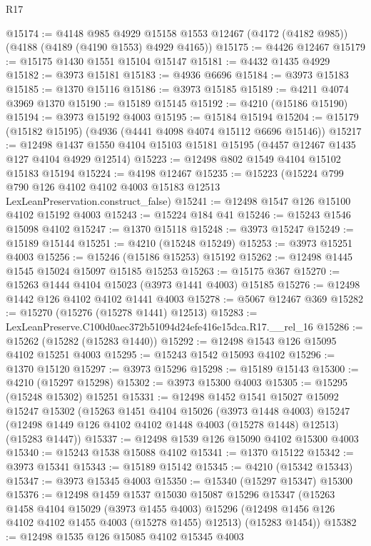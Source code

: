 \begin{lexlean}{R17}
\begin{coremodule}
@15174 := @4148
    @985
    @4929
    @15158
    @1553
    @12467
    (@4172 (@4182 @985))
    (@4188 (@4189 (@4190 @1553) @4929 @4165))
@15175 := @4426 @12467
@15179 := @15175 @1430 @1551 @15104 @15147
@15181 := @4432 @1435 @4929
@15182 := @3973 @15181
@15183 := @4936 @6696
@15184 := @3973 @15183
@15185 := @1370 @15116
@15186 := @3973 @15185
@15189 := @4211 @4074 @3969 @1370
@15190 := @15189 @15145
@15192 := @4210 (@15186 @15190)
@15194 := @3973 @15192 @4003
@15195 := @15184 @15194
@15204 := @15179 (@15182 @15195) (@4936 (@4441 @4098 @4074 @15112 @6696 @15146))
@15217 := @12498 @1437 @1550 @4104 @15103 @15181 @15195 (@4457 @12467 @1435 @127 @4104 @4929 @12514)
@15223 := @12498 @802 @1549 @4104 @15102 @15183 @15194
@15224 := @4198 @12467
@15235 := @15223
    (@15224 @799 @790 @126 @4102 @4102 @4003 @15183 @12513 LexLeanPreservation.construct_false)
@15241 := @12498 @1547 @126 @15100 @4102 @15192 @4003
@15243 := @15224 @184 @41
@15246 := @15243 @1546 @15098 @4102
@15247 := @1370 @15118
@15248 := @3973 @15247
@15249 := @15189 @15144
@15251 := @4210 (@15248 @15249)
@15253 := @3973 @15251 @4003
@15256 := @15246 (@15186 @15253) @15192
@15262 := @12498 @1445 @1545 @15024 @15097 @15185 @15253
@15263 := @15175 @367
@15270 := @15263 @1444 @4104 @15023 (@3973 @1441 @4003) @15185
@15276 := @12498 @1442 @126 @4102 @4102 @1441 @4003
@15278 := @5067 @12467 @369
@15282 := @15270 (@15276 (@15278 @1441) @12513)
@15283 := LexLeanPreserve.C100d0aec372b51094d24efe416e15dca.R17.__rel_16
@15286 := @15262 (@15282 (@15283 @1440))
@15292 := @12498 @1543 @126 @15095 @4102 @15251 @4003
@15295 := @15243 @1542 @15093 @4102
@15296 := @1370 @15120
@15297 := @3973 @15296
@15298 := @15189 @15143
@15300 := @4210 (@15297 @15298)
@15302 := @3973 @15300 @4003
@15305 := @15295 (@15248 @15302) @15251
@15331 := @12498
    @1452
    @1541
    @15027
    @15092
    @15247
    @15302
    (@15263
      @1451
      @4104
      @15026
      (@3973 @1448 @4003)
      @15247
      (@12498 @1449 @126 @4102 @4102 @1448 @4003 (@15278 @1448) @12513)
      (@15283 @1447))
@15337 := @12498 @1539 @126 @15090 @4102 @15300 @4003
@15340 := @15243 @1538 @15088 @4102
@15341 := @1370 @15122
@15342 := @3973 @15341
@15343 := @15189 @15142
@15345 := @4210 (@15342 @15343)
@15347 := @3973 @15345 @4003
@15350 := @15340 (@15297 @15347) @15300
@15376 := @12498
    @1459
    @1537
    @15030
    @15087
    @15296
    @15347
    (@15263
      @1458
      @4104
      @15029
      (@3973 @1455 @4003)
      @15296
      (@12498 @1456 @126 @4102 @4102 @1455 @4003 (@15278 @1455) @12513)
      (@15283 @1454))
@15382 := @12498 @1535 @126 @15085 @4102 @15345 @4003

\end{coremodule}
\end{lexlean}
